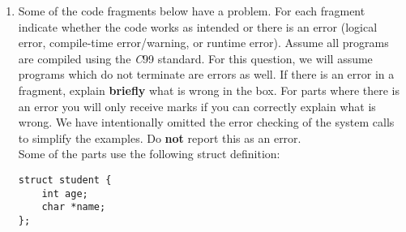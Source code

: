 \documentclass[11pt]{article}
\begin{document}
\begin{enumerate}
\begin{tabular}[c]{| l | l | l |}
\begin{minipage}{0.3\textwidth}
\begin{Verbatim}
struct node y;










				\end{Verbatim}
			\end{minipage}\\
			\hline
			\begin{minipage}{0.3\textwidth}
				\begin{Verbatim}

char fun(char *str, int n) {
	return str[n];
}
y = fun("hello", 1);
x = &y;
				\end{Verbatim}
			\end{minipage} &
			\begin{minipage}{0.3\textwidth}
				\begin{Verbatim}

char *x;




				\end{Verbatim}
			\end{minipage} &
			\begin{minipage}{0.3\textwidth}
				\begin{Verbatim}

char y;




				\end{Verbatim}
			\end{minipage}\\
			\hline
		\end{tabular}

	\newpage
	\item Some of the code fragments below have a problem. For each fragment indicate whether the code works as intended or there is an error (logical error, compile-time error/warning, or runtime error). Assume all programs are compiled using the \textit{C}99 standard. For this question, we will assume programs which do not terminate are errors as well. If there is an error in a fragment, explain \textbf{briefly} what is wrong in the box. For parts where there is an error you will only receive marks if you can correctly explain what is wrong. We have intentionally omitted the error checking of the system calls to simplify the examples. Do \textbf{not} report this as an error.\\
	Some of the parts use the following struct definition:
	\begin{Verbatim}
struct student {
	int age;
	char *name;
};
	\end{Verbatim}



\end{enumerate}
\end{document}
